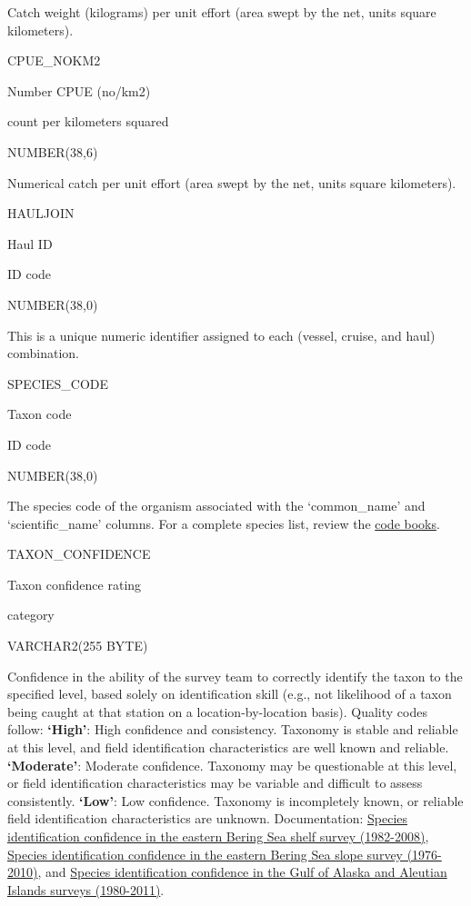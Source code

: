\documentclass[
  letterpaper,
  oneside,
  open=any]{scrbook}
\begin{document}
Catch weight (kilograms) per unit effort (area swept by the net, units
square kilometers).

CPUE\_NOKM2

Number CPUE (no/km2)

count per kilometers squared

NUMBER(38,6)

Numerical catch per unit effort (area swept by the net, units square
kilometers).

HAULJOIN

Haul ID

ID code

NUMBER(38,0)

This is a unique numeric identifier assigned to each (vessel, cruise,
and haul) combination.

SPECIES\_CODE

Taxon code

ID code

NUMBER(38,0)

The species code of the organism associated with the `common\_name' and
`scientific\_name' columns. For a complete species list, review the
\href{https://www.fisheries.noaa.gov/resource/document/groundfish-survey-species-code-manual-and-data-codes-manual}{code
books}.

TAXON\_CONFIDENCE

Taxon confidence rating

category

VARCHAR2(255 BYTE)

Confidence in the ability of the survey team to correctly identify the
taxon to the specified level, based solely on identification skill
(e.g., not likelihood of a taxon being caught at that station on a
location-by-location basis). Quality codes follow: \textbf{`High'}: High
confidence and consistency. Taxonomy is stable and reliable at this
level, and field identification characteristics are well known and
reliable. \textbf{`Moderate'}: Moderate confidence. Taxonomy may be
questionable at this level, or field identification characteristics may
be variable and difficult to assess consistently. \textbf{`Low'}: Low
confidence. Taxonomy is incompletely known, or reliable field
identification characteristics are unknown. Documentation:
\href{http://apps-afsc.fisheries.noaa.gov/Publications/ProcRpt/PR2009-04.pdf}{Species
identification confidence in the eastern Bering Sea shelf survey
(1982-2008)},
\href{http://apps-afsc.fisheries.noaa.gov/Publications/ProcRpt/PR2014-05.pdf}{Species
identification confidence in the eastern Bering Sea slope survey
(1976-2010)}, and
\href{http://apps-afsc.fisheries.noaa.gov/Publications/ProcRpt/PR2014-01.pdf}{Species
identification confidence in the Gulf of Alaska and Aleutian Islands
surveys (1980-2011)}.
\end{document}
